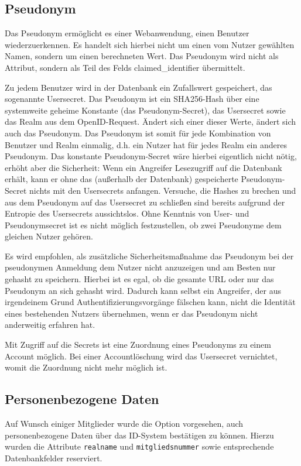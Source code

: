 \documentclass[parskip=half]{scrartcl}
\begin{document}
\subsection{Pseudonym}
\label{sec:pseudo}
Das Pseudonym ermöglicht es einer Webanwendung, einen Benutzer wiederzuerkennen.
Es handelt sich hierbei nicht um einen vom Nutzer gewählten Namen, sondern um einen berechneten Wert.
Das Pseudonym wird nicht als Attribut, sondern als Teil des Felds claimed\_identifier übermittelt.

Zu jedem Benutzer wird in der Datenbank ein Zufallswert gespeichert, das sogenannte Usersecret. 
Das Pseudonym ist ein SHA256-Hash über eine systemweite geheime Konstante (das Pseudonym-Secret), das Usersecret sowie das Realm aus dem OpenID-Request.
Ändert sich einer dieser Werte, ändert sich auch das Pseudonym.
Das Pseudonym ist somit für jede Kombination von Benutzer und Realm einmalig, d.h. ein Nutzer hat für jedes Realm ein anderes Pseudonym.
Das konstante Pseudonym-Secret wäre hierbei eigentlich nicht nötig, erhöht aber die Sicherheit:
Wenn ein Angreifer Lesezugriff auf die Datenbank erhält, kann er ohne das (außerhalb der Datenbank) gespeicherte Pseudonym-Secret nichts mit den Usersecrets anfangen.
Versuche, die Hashes zu brechen und aus dem Pseudonym auf das Usersecret zu schließen sind bereits aufgrund der Entropie des Usersecrets aussichtslos.
Ohne Kenntnis von User- und Pseudonymsecret ist es nicht möglich festzustellen, ob zwei Pseudonyme dem gleichen Nutzer gehören.

Es wird empfohlen, als zusätzliche Sicherheitsmaßnahme das Pseudonym bei der pseudonymen Anmeldung dem Nutzer nicht anzuzeigen und am Besten nur gehasht zu speichern.
Hierbei ist es egal, ob die gesamte URL oder nur das Pseudonym an sich gehasht wird.
Dadurch kann selbst ein Angreifer, der aus irgendeinem Grund Authentifizierungsvorgänge fälschen kann, nicht die Identität eines bestehenden Nutzers übernehmen,
wenn er das Pseudonym nicht anderweitig erfahren hat.

Mit Zugriff auf die Secrets ist eine Zuordnung eines Pseudonyms zu einem Account möglich.
Bei einer Accountlöschung wird das Usersecret vernichtet, womit die Zuordnung nicht mehr möglich ist.

\subsection{Personenbezogene Daten}
Auf Wunsch einiger Mitglieder wurde die Option vorgesehen, auch personenbezogene Daten über das ID-System bestätigen zu können.
Hierzu wurden die Attribute \texttt{realname} und \texttt{mitgliedsnummer} sowie entsprechende Datenbankfelder reserviert.
\end{document}
